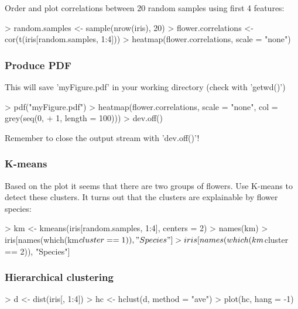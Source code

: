 \documentclass[10pt,a4paper]{article}
\begin{document}
Order and plot correlations between 20 random samples using first 4
features:

\begin{Schunk}
\begin{Sinput}
> random.samples <- sample(nrow(iris), 20)
> flower.correlations <- cor(t(iris[random.samples, 1:4]))
> heatmap(flower.correlations, scale = "none")
\end{Sinput}
\end{Schunk}


\subsubsection*{Produce PDF}

This will save 'myFigure.pdf' in your working directory (check with
'getwd()')

\begin{Schunk}
\begin{Sinput}
> pdf("myFigure.pdf")
> heatmap(flower.correlations, scale = "none", col = grey(seq(0, 
+     1, length = 100)))
> dev.off()
\end{Sinput}
\end{Schunk}

Remember to close the output stream with 'dev.off()'!


\subsubsection*{K-means}

Based on the plot it seems that there are two groups of flowers. Use
K-means to detect these clusters. It turns out that the clusters are
explainable by flower species:

\begin{Schunk}
\begin{Sinput}
> km <- kmeans(iris[random.samples, 1:4], centers = 2)
> names(km)
> iris[names(which(km$cluster == 1)), "Species"]
> iris[names(which(km$cluster == 2)), "Species"]
\end{Sinput}
\end{Schunk}

\subsubsection*{Hierarchical clustering}


\begin{Schunk}
\begin{Sinput}
> d <- dist(iris[, 1:4])
> hc <- hclust(d, method = "ave")
> plot(hc, hang = -1)
\end{Sinput}
\end{Schunk}
\end{document}
